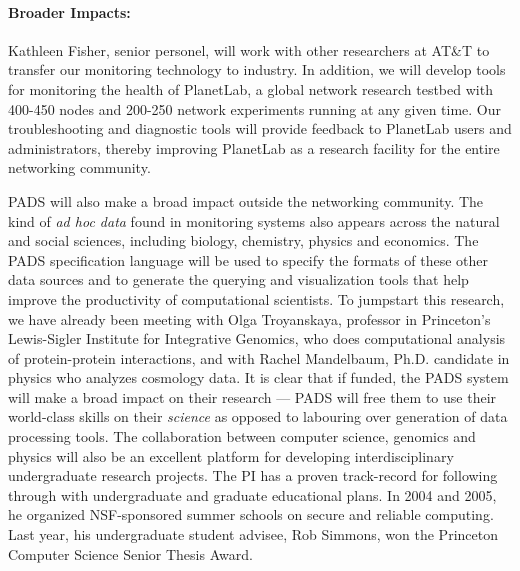 \paragraph*{Broader Impacts:}  Kathleen Fisher, senior personel, 
will work with other researchers at AT\&T to transfer our monitoring technology
to industry.  In addition, we will develop tools 
for monitoring the health of PlanetLab, a global network
research testbed with 400-450 nodes and 200-250 network
experiments running at any given time.  Our troubleshooting and 
diagnostic tools will provide feedback to PlanetLab users and administrators, 
thereby improving PlanetLab as a research facility
for the entire networking community. 

PADS will also make a broad impact outside the networking community.
The kind of {\em ad hoc data} found in monitoring systems also appears
across the natural and social sciences, including biology, chemistry,
physics and economics.  The PADS specification language will be used to
specify the formats of these other data sources and to generate the
querying and visualization tools that help improve
the productivity of computational scientists.  To jumpstart this
research, we have already been meeting with Olga Troyanskaya,
professor in Princeton's Lewis-Sigler Institute for Integrative
Genomics, who does computational analysis of protein-protein
interactions, and with Rachel Mandelbaum, Ph.D. candidate in physics
who analyzes cosmology data.  It is clear that if funded, the PADS system
will make a broad impact on their research --- PADS will free them to use
their world-class skills on their {\em science} 
as opposed to labouring over generation of data processing tools.
The collaboration between computer science, genomics and physics will
also be an excellent platform for developing interdisciplinary
undergraduate research projects.  The PI has a proven track-record for
following through with undergraduate and graduate educational plans.
In 2004 and 2005, he organized NSF-sponsored summer schools on secure
and reliable computing.  Last year, his undergraduate student advisee,
Rob Simmons, won the Princeton Computer Science Senior Thesis Award.

